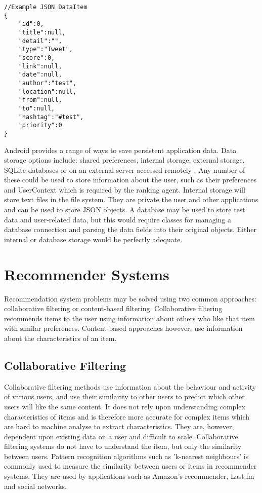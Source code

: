 \lstset{language=Java, caption=JSON test data example, label=JSONExample}
\begin{lstlisting}
//Example JSON DataItem
{
	"id":0,
	"title":null,
	"detail":"",
	"type":"Tweet",	
	"score":0,
	"link":null,
	"date":null,
	"author":"test",
	"location":null,
	"from":null,
	"to":null,
	"hashtag":"#test",
	"priority":0
}
\end{lstlisting}

Android provides a range of ways to save persistent application data. Data storage options include: shared preferences, internal storage, external storage, SQLite databases or on an external server accessed remotely \cite{BeginningAndroidDataPersistence}. Any number of these could be used to store information about the user, such as their preferences and UserContext which is required by the ranking agent. 
Internal storage will store text files in the file system. They are private the user and other applications and can be used to store JSON objects. A database may be used to store test data and user-related data, but this would require classes for managing a database connection and parsing the data fields into their original objects. Either internal or database storage would be perfectly adequate.

\section{Recommender Systems}

Recommendation system problems may be solved using two common approaches: collaborative filtering or content-based filtering. Collaborative filtering recommends items to the user using information about others who like that item with similar preferences. Content-based approaches however, use information about the characteristics of an item. 

\subsection{Collaborative Filtering}

Collaborative filtering methods use information about the behaviour and activity of various users, and use their similarity to other users to predict which other users will like the same content. It does not rely upon understanding complex characteristics of items and is therefore more accurate for complex items which are hard to machine analyse to extract characteristics. They are, however, dependent upon existing data on a user and difficult to scale. 
Collaborative filtering systems do not have to understand the item, but only the similarity between users. Pattern recognition algorithms such as 'k-nearest neighbours' is commonly used to measure the similarity between users or items in recommender systems. They are used by applications such as Amazon's recommender, Last.fm and social networks. 


